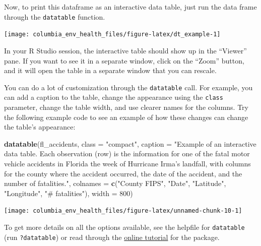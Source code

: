 \documentclass[]{tufte-book}
\newenvironment{Shaded}{}{}
\newcommand{\DataTypeTok}[1]{\textcolor[rgb]{0.56,0.13,0.00}{#1}}
\newcommand{\DecValTok}[1]{\textcolor[rgb]{0.25,0.63,0.44}{#1}}
\newcommand{\KeywordTok}[1]{\textcolor[rgb]{0.00,0.44,0.13}{\textbf{#1}}}
\newcommand{\NormalTok}[1]{#1}
\newcommand{\OperatorTok}[1]{\textcolor[rgb]{0.40,0.40,0.40}{#1}}
\newcommand{\StringTok}[1]{\textcolor[rgb]{0.25,0.44,0.63}{#1}}
\begin{document}
Now, to print this dataframe as an interactive data table, just run the data frame through
the \texttt{datatable} function.

\begin{Shaded}
\end{Shaded}

\texttt{[image: columbia\_env\_health\_files/figure-latex/dt\_example-1]}

In your R Studio session, the interactive table should show up
in the ``Viewer'' pane. If you want to see it in a separate window, click on the ``Zoom'' button,
and it will open the table in a separate window that you can rescale.

You can do a lot of customization through the \texttt{datatable} call. For example, you can
add a caption to the table, change the appearance using the \texttt{class} parameter, change the
table width, and
use clearer names for the columns. Try the following example code to see an example of how these
changes can change the table's appearance:

\begin{Shaded}
\begin{Highlighting}[]
\KeywordTok{datatable}\NormalTok{(fl_accidents, }\DataTypeTok{class =} \StringTok{"compact"}\NormalTok{, }\DataTypeTok{caption =} \StringTok{"Example of an interactive data table. Each observation (row) is the information for one of the fatal motor vehicle accidents in Florida the week of Hurricane Irma's landfall, with columns for the county where the accident occurred, the date of the accident, and the number of fatalities."}\NormalTok{, }
    \DataTypeTok{colnames =} \KeywordTok{c}\NormalTok{(}\StringTok{"County FIPS"}\NormalTok{, }\StringTok{"Date"}\NormalTok{, }\StringTok{"Latitude"}\NormalTok{, }
        \StringTok{"Longitude"}\NormalTok{, }\StringTok{"# fatalities"}\NormalTok{), }\DataTypeTok{width =} \DecValTok{800}\NormalTok{)}
\end{Highlighting}
\end{Shaded}

\texttt{[image: columbia\_env\_health\_files/figure-latex/unnamed-chunk-10-1]}

To get more details on all the options available, see the helpfile for \texttt{datatable} (run \texttt{?datatable}) or read through the \href{}{online tutorial} for the package.
\end{document}
